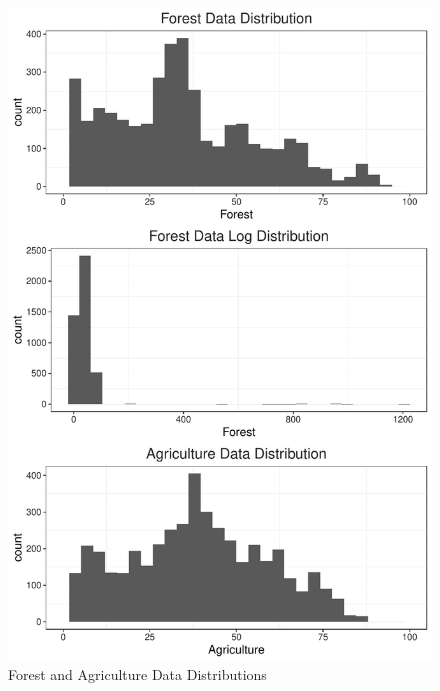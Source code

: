 \documentclass[12pt,]{article}
\begin{document}
\begin{figure}
\centering
\includegraphics{Marx_ENV872_Project_files/figure-latex/unnamed-chunk-4-1.pdf}
\caption{\label{fig:fig3}Forest and Agriculture Data Distributions}
\end{figure}
\end{document}
